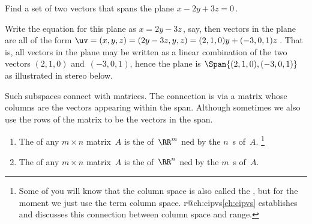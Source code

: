 \begin{example} \label{eg:planesubs}
Find a set of two vectors that spans the plane \(x-2y+3z=0\)\,.
\begin{solution} 
Write the equation for this plane as \(x=2y-3z\)\,, say, then vectors in the plane are all of the form \(\uv=(x,y,z)=(2y-3z,y,z) =(2,1,0)y+(-3,0,1)z\)\,.
That is, all vectors in the plane may be written as a linear combination of the two vectors \((2,1,0)\) and~\((-3,0,1)\),
hence the plane is \(\Span\{(2,1,0),(-3,0,1)\}\) as illustrated in stereo below. 
\begin{center}
 {}
\end{center}
\end{solution}
\end{example}



Such subspaces connect with matrices.
The connection is via a matrix whose columns are the vectors appearing within the span.
Although sometimes we also use the rows of the matrix to be the vectors in the span.


\begin{definition}\label{def:colsp} 
    \begin{enumerate}
        \item\label{def:colspa} The  of any $m\times n$ matrix~$A$ is the  of~$\RR^m$ ned by the \(n\)~s of~$A$.
        \footnote{Some of you will know that the column space is also called the , but for the moment we just use the term column space. \ifcsname r@ch:cipvs\endcsname \autoref{ch:cipvs} establishes and discusses this connection between column space and range.\fi}
        
		\item\label{def:colspb} The  of any $m\times n$ matrix~$A$ is the  of~$\RR^n$ ned by the \(m\)~s of~$A$.  
    \end{enumerate}
\end{definition}


